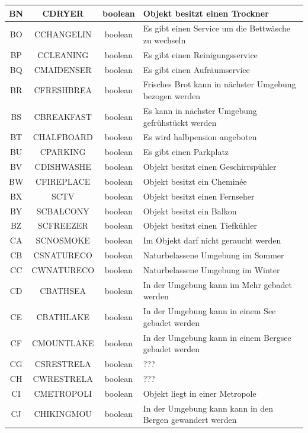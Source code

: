 \begin{longtable}{ | c | c | c | L{7.5cm} | }
	BN & CDRYER & boolean & Objekt besitzt einen Trockner \\ \hline 
	BO & CCHANGELIN & boolean & Es gibt einen Service um die Bettwäsche zu wechseln \\ \hline 
	BP & CCLEANING & boolean & Es gibt einen Reinigungsservice \\ \hline 
	BQ & CMAIDENSER & boolean & Es gibt einen Aufräumservice \\ \hline 
	BR & CFRESHBREA & boolean & Frisches Brot kann in nächster Umgebung bezogen werden \\ \hline 
	BS & CBREAKFAST & boolean & Es kann in nächster Umgebung gefrühstückt werden \\ \hline 
	BT & CHALFBOARD & boolean & Es wird halbpension angeboten \\ \hline 
	BU & CPARKING & boolean & Es gibt einen Parkplatz \\ \hline 
	BV & CDISHWASHE & boolean & Objekt besitzt einen Geschirrspühler \\ \hline 
	BW & CFIREPLACE & boolean & Objekt besitzt ein Cheminée \\ \hline 
	BX & SCTV & boolean & Objekt besitzt einen Fernseher \\ \hline 
	BY & SCBALCONY & boolean & Objekt besitzt ein Balkon \\ \hline 
	BZ & SCFREEZER & boolean & Objekt besitzt einen Tiefkühler \\ \hline 
	CA & SCNOSMOKE & boolean & Im Objekt darf nicht geraucht werden \\ \hline 
	CB & CSNATURECO & boolean & Naturbelassene Umgebung im Sommer \\ \hline 
	CC & CWNATURECO & boolean & Naturbelassene Umgebung im Winter \\ \hline 
	CD & CBATHSEA & boolean & In der Umgebung kann im Mehr gebadet werden \\ \hline 
	CE & CBATHLAKE & boolean & In der Umgebung kann in einem See gebadet werden \\ \hline 
	CF & CMOUNTLAKE & boolean & In der Umgebung kann in einem Bergsee gebadet werden \\ \hline 
	CG & CSRESTRELA & boolean & ??? \\ \hline 
	CH & CWRESTRELA & boolean & ??? \\ \hline 
	CI & CMETROPOLI & boolean & Objekt liegt in einer Metropole \\ \hline 
	CJ & CHIKINGMOU & boolean & In der Umgebung kann kann in den Bergen gewandert werden \\ \hline 

\end{longtable}
